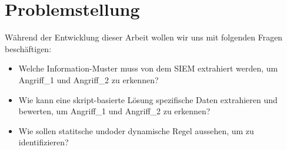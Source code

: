 \section{Problemstellung}

Während der Entwicklung dieser Arbeit wollen wir uns mit folgenden Fragen beschäftigen:

\begin{itemize}
   \item Welche Information-Muster muss von dem \gls{SIEM} extrahiert werden, um Angriff\_1 und Angriff\_2 zu erkennen?
   \item Wie kann eine skript-basierte Lösung spezifische Daten extrahieren und bewerten, um Angriff\_1 und Angriff\_2 zu erkennen?
   \item Wie sollen statitsche und\/oder dynamische Regel aussehen, um  zu identifizieren?
\end{itemize}

